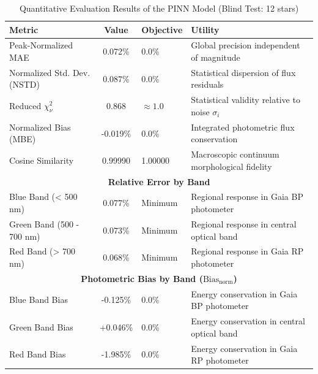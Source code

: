 
\begin{table}[htpb]
\centering
\caption{Quantitative Evaluation Results of the PINN Model (Blind Test: 12 stars)}
\label{tab:pinn_evaluation}
\begin{tabular}{lcll}
\hline
\textbf{Metric} & \textbf{Value} & \textbf{Objective} & \textbf{Utility} \\
\hline
Peak-Normalized MAE & 0.072\% & 0.0\% & Global precision independent of magnitude \\
Normalized Std. Dev. (NSTD) & 0.087\% & 0.0\% & Statistical dispersion of flux residuals \\
Reduced $\chi^2_\nu$ & 0.868 & $\approx 1.0$ & Statistical validity relative to noise $\sigma_i$ \\
Normalized Bias (MBE) & -0.019\% & 0.0\% & Integrated photometric flux conservation \\
Cosine Similarity & 0.99990 & 1.00000 & Macroscopic continuum morphological fidelity \\
\hline
\multicolumn{4}{c}{\textbf{Relative Error by Band}} \\
\hline
Blue Band (< 500 nm) & 0.077\% & Minimum & Regional response in Gaia BP photometer \\
Green Band (500 - 700 nm) & 0.073\% & Minimum & Regional response in central optical band \\
Red Band (> 700 nm) & 0.068\% & Minimum & Regional response in Gaia RP photometer \\
\hline
\multicolumn{4}{c}{\textbf{Photometric Bias by Band ($\text{Bias}_{\text{norm}}$)}} \\
\hline
Blue Band Bias & -0.125\% & 0.0\% & Energy conservation in Gaia BP photometer \\
Green Band Bias & +0.046\% & 0.0\% & Energy conservation in central optical band \\
Red Band Bias & -1.985\% & 0.0\% & Energy conservation in Gaia RP photometer \\
\hline
\end{tabular}
\end{table}
